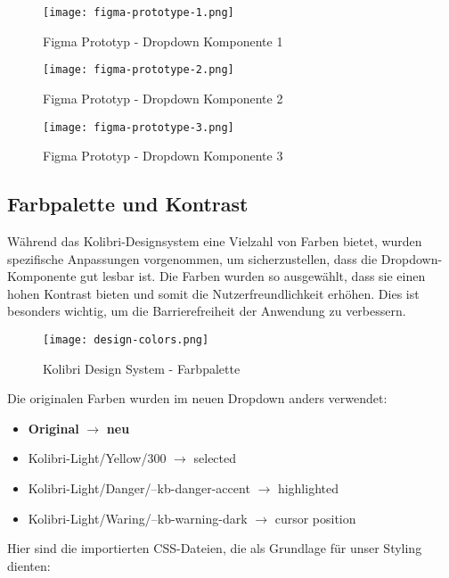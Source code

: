 \begin{figure}[!htb]
    \centering
    \texttt{[image: figma-prototype-1.png]}
    \caption{Figma Prototyp - Dropdown Komponente 1}
    \label{img:figmaPrototype1}
\end{figure}

\begin{figure}[!htb]
    \centering
    \texttt{[image: figma-prototype-2.png]}
    \caption{Figma Prototyp - Dropdown Komponente 2}
    \label{img:figmaPrototype2}
\end{figure}

\begin{figure}[!htb]
    \centering
    \texttt{[image: figma-prototype-3.png]}
    \caption{Figma Prototyp - Dropdown Komponente 3}
    \label{img:figmaPrototype3}
\end{figure}


\subsection{Farbpalette und Kontrast}

Während das Kolibri-Designsystem eine Vielzahl von Farben bietet, wurden spezifische Anpassungen vorgenommen, um sicherzustellen, dass die Dropdown-Komponente gut lesbar ist. 
Die Farben wurden so ausgewählt, dass sie einen hohen Kontrast bieten und somit die Nutzerfreundlichkeit erhöhen. 
Dies ist besonders wichtig, um die Barrierefreiheit der Anwendung zu verbessern.

\begin{figure}[!htb]
    \centering
    \texttt{[image: design-colors.png]}
    \caption{Kolibri Design System - Farbpalette}
    \label{img:designColors}
\end{figure}

Die originalen Farben wurden im neuen Dropdown anders verwendet:

\begin{itemize}
    \item \textbf{Original} $\rightarrow$ \textbf{neu}
    \item Kolibri-Light/Yellow/300 $\rightarrow$ selected
    \item Kolibri-Light/Danger/--kb-danger-accent $\rightarrow$ highlighted
    \item Kolibri-Light/Waring/--kb-warning-dark $\rightarrow$ cursor position
\end{itemize}

Hier sind die importierten CSS-Dateien, die als Grundlage für unser Styling dienten:

